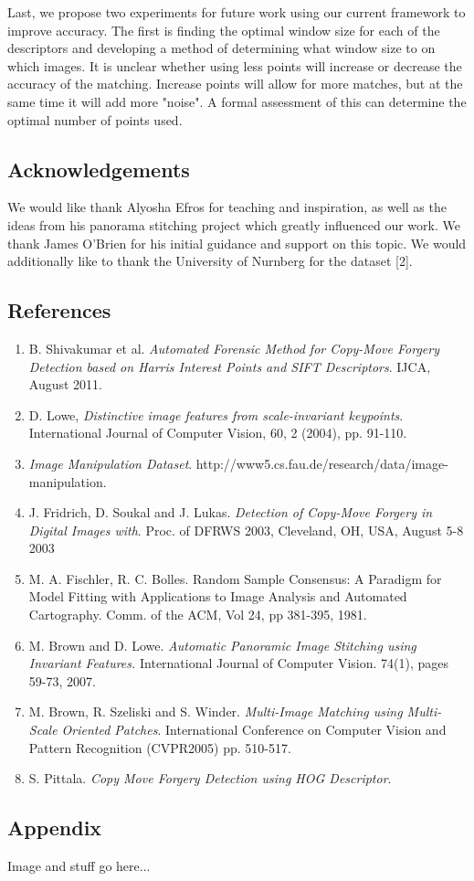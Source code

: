\documentclass[12pt]{article}
\begin{document}
Last, we propose two experiments for future work using our current framework to improve accuracy. The first is finding the optimal window size for each of the descriptors and developing a method of determining what window size to on which images. It is unclear whether using less points will increase or decrease the accuracy of the matching. Increase points will allow for more matches, but at the same time it will add more "noise". A formal assessment of this can determine the optimal number of points used. 

\subsection*{Acknowledgements}

We would like thank Alyosha Efros for teaching and inspiration, as well as the ideas from his panorama stitching project which greatly influenced our work. We thank James O'Brien for his initial guidance and support on this topic. We would additionally like to thank the University of Nurnberg for the dataset [2].

\subsection*{References}

\begin{enumerate}
\item B. Shivakumar et al. {\it Automated Forensic Method for Copy-Move Forgery Detection based on Harris Interest Points and SIFT Descriptors}. IJCA, August 2011. 
\item D. Lowe, {\it Distinctive image features from scale-invariant keypoints}. International Journal of Computer Vision, 60, 2 (2004), pp. 91-110.
\item {\it Image Manipulation Dataset}. http://www5.cs.fau.de/research/data/image-manipulation. 
\item J. Fridrich, D. Soukal and J. Lukas. {\it Detection of Copy-Move Forgery in Digital Images with}. Proc. of DFRWS 2003, Cleveland, OH, USA, August 5-8 2003
\item M. A. Fischler, R. C. Bolles. Random Sample Consensus: A Paradigm for Model Fitting with Applications to Image Analysis and Automated Cartography. Comm. of the ACM, Vol 24, pp 381-395, 1981. 
\item M. Brown and D. Lowe. {\it Automatic Panoramic Image Stitching using Invariant Features.} International Journal of Computer Vision. 74(1), pages 59-73, 2007.
\item M. Brown, R. Szeliski and S. Winder. {\it Multi-Image Matching using Multi-Scale Oriented Patches}. International Conference on Computer Vision and Pattern Recognition (CVPR2005) pp. 510-517.
\item S. Pittala. {\it Copy Move Forgery Detection using HOG Descriptor}.
\end{enumerate}

\subsection*{Appendix}

Image and stuff go here...
\end{document}
